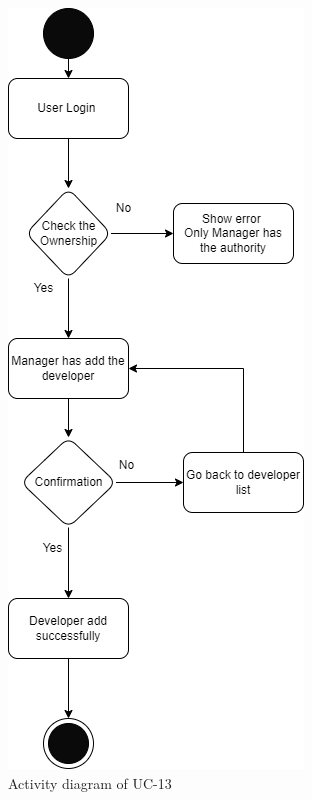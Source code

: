 \begin{figure}[H]
    \centering
    \includegraphics[scale=0.5]{./diagrams/Activity Diagram/ad-13.png}
    \caption{Activity diagram of UC-13}
    \label{fig:act-13}

\end{figure}


